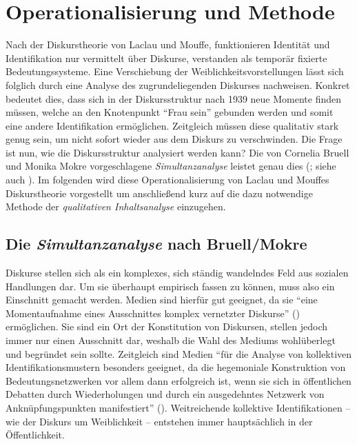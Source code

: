 \documentclass[12pt, titlepage=true, toc=bib]{scrartcl}
\begin{document}
\section{Operationalisierung und Methode}

Nach der Diskurstheorie von Laclau und Mouffe, funktionieren Identität und Identifikation nur vermittelt über Diskurse, verstanden als temporär fixierte Bedeutungssysteme. Eine Verschiebung der Weiblichkeitsvorstellungen lässt sich folglich durch eine Analyse des zugrundeliegenden Diskurses nachweisen. Konkret bedeutet dies, dass sich in der Diskursstruktur nach 1939 neue Momente finden müssen, welche an den Knotenpunkt "`Frau sein"' gebunden werden und somit eine andere Identifikation ermöglichen. Zeitgleich müssen diese qualitativ stark genug sein, um nicht sofort wieder aus dem Diskurs zu verschwinden. Die Frage ist nun, wie die Diskursstruktur analysiert werden kann? Die von Cornelia Bruell und Monika Mokre vorgeschlagene \textit{Simultanzanalyse} leistet genau dies (\cite*{bruell_chancen_2006}; siehe auch \cite{nonhoff_kollektive_2007}). Im folgenden wird diese Operationalisierung von Laclau und Mouffes Diskurstheorie vorgestellt um anschließend kurz auf die dazu notwendige Methode der \textit{qualitativen Inhaltsanalyse} einzugehen.

\subsection{Die \textit{Simultanzanalyse} nach Bruell/Mokre}

Diskurse stellen sich als ein komplexes, sich ständig wandelndes Feld aus sozialen Handlungen dar. Um sie überhaupt empirisch fassen zu können, muss also ein Einschnitt gemacht werden. Medien sind hierfür gut geeignet, da sie "`eine Momentaufnahme eines Ausschnittes komplex vernetzter Diskurse"' (\cite[8]{bruell_chancen_2006}) ermöglichen. Sie sind ein Ort der Konstitution von Diskursen, stellen jedoch immer nur einen Ausschnitt dar, weshalb die Wahl des Mediums wohlüberlegt und begründet sein sollte. Zeitgleich sind Medien "`für die Analyse von kollektiven Identifikationsmustern besonders geeignet, da die hegemoniale Konstruktion von Bedeutungsnetzwerken vor allem dann erfolgreich ist, wenn sie sich in öffentlichen Debatten durch Wiederholungen und durch ein ausgedehntes Netzwerk von Anknüpfungspunkten manifestiert"' (\cite[202]{nonhoff_kollektive_2007}). Weitreichende kollektive Identifikationen -- wie der Diskurs um Weiblichkeit -- entstehen immer hauptsächlich in der Öffentlichkeit. 
\end{document}
